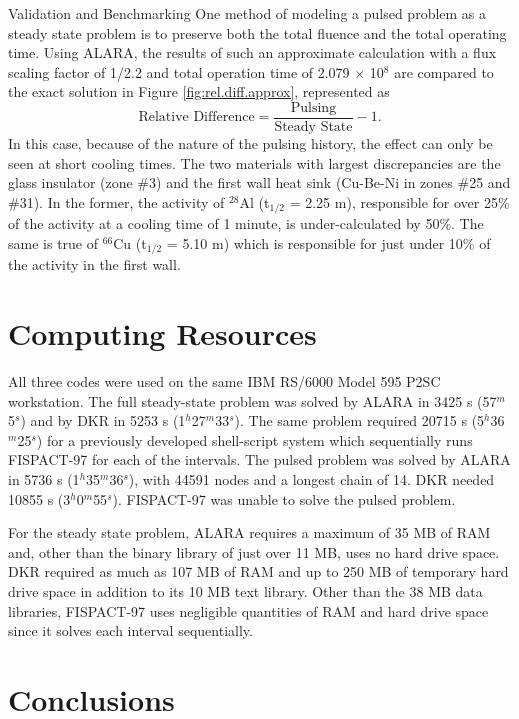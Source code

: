 \begin{chapter}{Validation and Benchmarking}
One method of modeling a pulsed problem as a steady state problem is
to preserve both the total fluence and the total operating
time\cite{bib:sisolak,bib:hosny,bib:qingming}.  Using ALARA, the
results of such an approximate calculation with a flux scaling factor
of 1/2.2 and total operation time of 2.079 $\times$ 10$^8$ are
compared to the exact solution in Figure \ref{fig:rel.diff.approx},
represented as
$$\mbox{Relative Difference} = \frac{\mbox{Pulsing}}{\mbox{Steady
    State}} - 1.$$
In this case, because of the nature of the pulsing history, the effect
can only be seen at short cooling times.  The two materials with
largest discrepancies are the glass insulator (zone \#3) and the first
wall heat sink (Cu-Be-Ni in zones \#25 and \#31).  In the former, the
activity of $^{28}$Al (t$_{1/2}$ = 2.25 m), responsible for over 25\%
of the activity at a cooling time of 1 minute, is under-calculated by
50\%.  The same is true of $^{66}$Cu (t$_{1/2}$ = 5.10 m) which is
responsible for just under 10\% of the activity in the first wall.
    


\section{Computing Resources}

All three codes were used on the same IBM RS/6000 Model 595 P2SC
workstation.  The full steady-state problem was solved by ALARA in
3425 s (57$^m$5$^s$) and by DKR in 5253 s (1$^h$27$^m$33$^s$).  The
same problem required 20715 s (5$^h$36$^m$25$^s$) for a previously
developed shell-script system which sequentially runs FISPACT-97 for
each of the intervals.  The pulsed problem was solved by ALARA in 5736
s (1$^h$35$^m$36$^s$), with 44591 nodes and a longest chain of 14.
DKR needed 10855 s (3$^h$0$^m$55$^s$).  FISPACT-97 was unable to solve
the pulsed problem.

For the steady state problem, ALARA requires a maximum of 35 MB of RAM
and, other than the binary library of just over 11 MB, uses no hard
drive space.  DKR required as much as 107 MB of RAM and up to
250 MB of temporary hard drive space in addition to its 10 MB text
library.  Other than the 38 MB data libraries, FISPACT-97 uses
negligible quantities of RAM and hard drive space since it solves each
interval sequentially.


\section{Conclusions}


\end{chapter}
